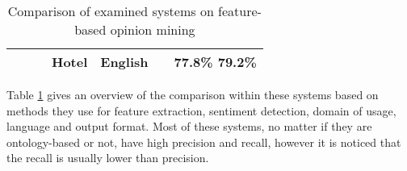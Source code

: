 \begin{table}[h!]
\begin{tabular}{|m{1.7cm}||m{2.4cm}|m{2.6cm}|m{1.15cm}|m{1.15cm}|m{2.85cm}| m{0.8cm}|}
\centering  {The proposed approach} & \centering {Ontology-based \& lexicon-based (WordNet)} & \centering  {Rule-based and lexicon based (VADER)} & {Hotel} & {English} & \centering {Matrix of discrete scores per each sentence and features} & {77.8\% 79.2\%} \\ \hline
\end{tabular}
\caption{Comparison of examined systems on feature-based opinion mining}
\label{comparison}
\end{table}


Table \ref{comparison} gives an overview of the comparison within these systems based on methods they use for feature extraction, sentiment detection, domain of usage, language and output format. Most of these systems, no matter if they are ontology-based or not, have high precision and recall, however it is noticed that the recall is usually lower than precision.


